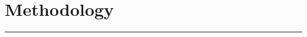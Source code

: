 \pagebreak

\section{Methodology}
\noindent\rule{\textwidth}{1pt}
\begin{multicols}{2}
    
    
    
    
    
    
    
    
    
    
    
    
    
    
\end{multicols}